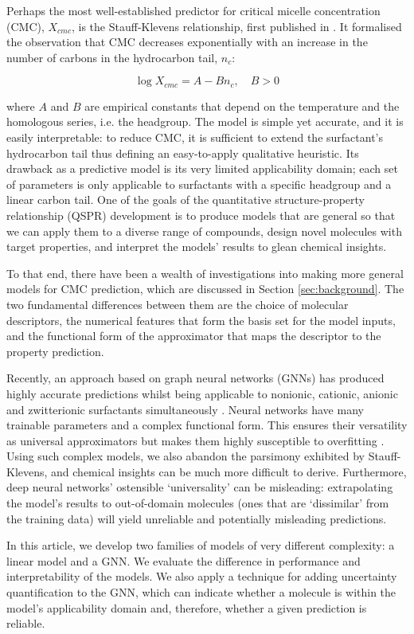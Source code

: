 Perhaps the most well-established predictor for critical micelle concentration (CMC), $X_{cmc}$, is the Stauff-Klevens relationship, first published in \citeyear{klevensStructureAggregationDilate1953} \cite{klevensStructureAggregationDilate1953}. It formalised the observation that CMC decreases exponentially with an increase in the number of carbons in the hydrocarbon tail, $n_c$:

\begin{equation}
    \label{eq:klevens}
    \log X_{cmc} = A - Bn_c, \quad B > 0
\end{equation}

where $A$ and $B$ are empirical constants that depend on the temperature and the homologous series, i.e. the headgroup. The model is simple yet accurate, and it is easily interpretable: to reduce CMC, it is sufficient to extend the surfactant's hydrocarbon tail thus defining an easy-to-apply qualitative heuristic. Its drawback as a predictive model is its very limited applicability domain; each set of parameters is only applicable to surfactants with a specific headgroup and a linear carbon tail.
One of the goals of the quantitative structure-property relationship (QSPR) development is to produce models that are general so that we can apply them to a diverse range of compounds, design novel molecules with target properties, and
interpret the models' results to glean chemical insights.

To that end, there have been a wealth of investigations into making more general models for CMC prediction, which are discussed in Section \ref{sec:background}. The two fundamental differences between them are the choice of molecular
descriptors, the numerical features that form the basis set for the model inputs, and the functional form of the approximator that maps the descriptor to the property prediction. 

Recently, an approach based on graph neural networks (GNNs) has produced highly accurate predictions whilst being applicable to nonionic, cationic, anionic and zwitterionic surfactants simultaneously
\cite{qinPredictingCriticalMicelle2021}. Neural networks have many trainable parameters and a complex functional form. This ensures their versatility as universal approximators but makes them highly susceptible to overfitting \cite{bejaniSystematicReviewOverfitting2021}. Using such complex models, we also abandon the parsimony exhibited by Stauff-Klevens, and chemical insights can be much more difficult to derive. Furthermore, deep neural networks' ostensible `universality' can be misleading: extrapolating the model's results to out-of-domain molecules (ones that are `dissimilar' from the training data) will yield unreliable and potentially misleading predictions.

In this article, we develop two families of models of very different complexity: a linear model and a GNN. We evaluate the difference in performance and interpretability of the models. We also apply a technique for adding uncertainty
quantification to the GNN, which can indicate whether a molecule is within the model's applicability domain and, therefore, whether a given prediction is reliable.
